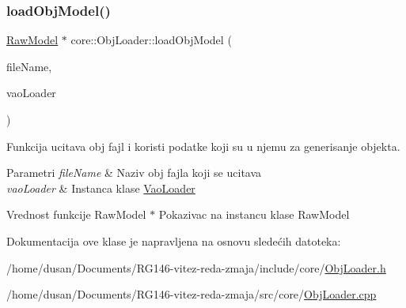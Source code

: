 \subsubsection{\texorpdfstring{load\+Obj\+Model()}{loadObjModel()}}
{\footnotesize\ttfamily \hyperlink{classmodel_1_1RawModel}{Raw\+Model} $\ast$ core\+::\+Obj\+Loader\+::load\+Obj\+Model (\begin{DoxyParamCaption}\item[{const char $\ast$}]{file\+Name,  }\item[{\hyperlink{classcore_1_1VaoLoader}{Vao\+Loader} $\ast$}]{vao\+Loader }\end{DoxyParamCaption})}



Funkcija ucitava obj fajl i koristi podatke koji su u njemu za generisanje objekta. 


\begin{DoxyParams}{Parametri}
{\em file\+Name} & Naziv obj fajla koji se ucitava \\
\hline
{\em vao\+Loader} & Instanca klase \hyperlink{classcore_1_1VaoLoader}{Vao\+Loader} \\
\hline
\end{DoxyParams}
\begin{DoxyReturn}{Vrednost funkcije}
Raw\+Model $\ast$ Pokazivac na instancu klase Raw\+Model 
\end{DoxyReturn}


Dokumentacija ove klase je napravljena na osnovu sledećih datoteka\+:\begin{DoxyCompactItemize}
\item 
/home/dusan/\+Documents/\+R\+G146-\/vitez-\/reda-\/zmaja/include/core/\hyperlink{ObjLoader_8h}{Obj\+Loader.\+h}\item 
/home/dusan/\+Documents/\+R\+G146-\/vitez-\/reda-\/zmaja/src/core/\hyperlink{ObjLoader_8cpp}{Obj\+Loader.\+cpp}\end{DoxyCompactItemize}

